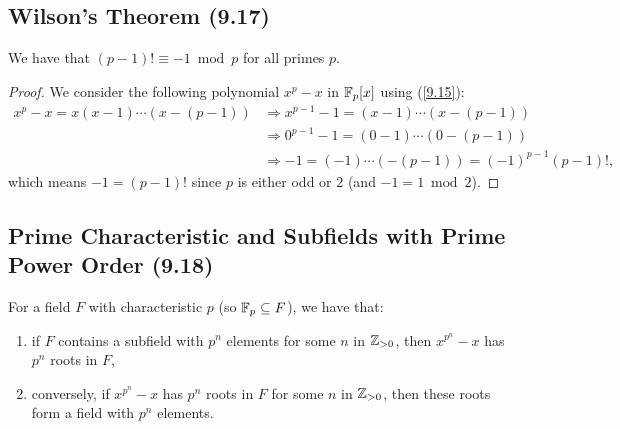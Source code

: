 \subsection{Wilson's Theorem (9.17)} \label{9.17}

We have that $(p - 1)! \equiv -1 \bmod p$ for all primes $p$.

\begin{proof}
    We consider the following polynomial $x^p - x$ in $\mathbb{F}_p[x]$ using
    (\ref{9.15}): \begin{align*}
        x^p - x = x(x - 1)\cdots(x - (p - 1))
        &\Longrightarrow x^{p - 1} - 1 = (x - 1)\cdots(x - (p - 1)) \\
        &\Longrightarrow 0^{p - 1} - 1 = (0 - 1)\cdots(0 - (p - 1)) \\
        &\Longrightarrow -1 = (-1)\cdots(-(p - 1)) = (-1)^{p - 1}(p - 1)!,
    \end{align*} which means $-1 = (p - 1)!$ since $p$ is either
    odd or $2$ (and $-1 = 1 \bmod 2$).
\end{proof}

\newpage

\subsection{Prime Characteristic and Subfields with Prime Power Order (9.18)} \label{9.18}

For a field $F$ with characteristic $p$ (so $\mathbb{F}_p \subseteq F$), we have that:
\begin{enumerate}
    \item if $F$ contains a subfield with $p^n$ elements for some $n$ in $\mathbb{Z}_{>0}$,
        then $x^{p^n} - x$ has $p^n$ roots in $F$,
    \item conversely, if $x^{p^n} - x$ has $p^n$ roots in $F$ for some $n$ in $\mathbb{Z}_{>0}$,
        then these roots form a field with $p^n$ elements.
\end{enumerate}


